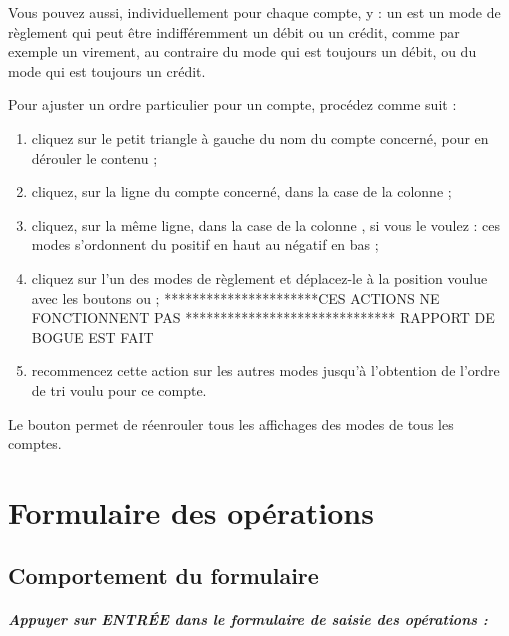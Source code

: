 Vous pouvez aussi, individuellement pour chaque compte, y  : un  est un mode de règlement qui peut être indifféremment un débit ou un crédit, comme par exemple un virement, au contraire du mode  qui est toujours un débit, ou du mode   qui est toujours un crédit. 

Pour ajuster un ordre particulier pour un compte, procédez comme suit :
\begin{enumerate}
	\item cliquez sur le petit triangle à gauche du nom du compte concerné, pour en dérouler le contenu ;
	\item cliquez, sur la ligne du compte concerné, dans la case de la colonne  ;
	\item cliquez, sur la même ligne, dans la case de la colonne , si vous le voulez : ces modes s'ordonnent du positif en haut au négatif en bas ;
	\item cliquez sur l'un des modes de règlement et déplacez-le à la position voulue avec les boutons  ou  ; **********************CES ACTIONS NE FONCTIONNENT PAS ****************************** RAPPORT DE BOGUE EST FAIT
	\item recommencez cette action sur les autres modes jusqu'à l'obtention de l'ordre de \gls{tri} voulu pour ce compte.
\end{enumerate}


Le bouton  permet de réenrouler tous les affichages des modes de tous les comptes.


\section{Formulaire des opérations\label{setup-form}}


\subsection{Comportement du formulaire\label{setup-form-behaviour}}

\subparagraph{Appuyer sur ENTRÉE dans le formulaire de saisie des opérations :\label{setup-form-behaviour-enter}}
 


